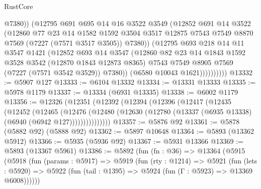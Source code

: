 \begin{lexlean}{RustCore}
\begin{coremodule}
                      @7380))
                  (@12795
                    @691
                    @695
                    @14
                    @16
                    @3522
                    @3549
                    (@12852
                      @691
                      @14
                      @3522
                      (@12860
                        @77
                        @23
                        @14
                        @1582
                        @1592
                        @3504
                        @3517
                        @12875
                        @7543
                        @7549
                        @8870
                        @7569
                        (@7227 (@7571 @3517 @3505))
                        @7380))
                    (@12795
                      @693
                      @218
                      @14
                      @11
                      @3547
                      @1421
                      (@12852
                        @693
                        @14
                        @3547
                        (@12860
                          @82
                          @23
                          @14
                          @1843
                          @1592
                          @3528
                          @3542
                          (@12870 @1843 @12873 @8365)
                          @7543
                          @7549
                          @8905
                          @7569
                          (@7227 (@7571 @3542 @3529))
                          @7380))
                      (@6580 @10043 @1621))))))))))
@13332 := @5907 @127
@13333 := @6104 @13332
@13334 := @13331 @13333
@13335 := @5978 @1179
@13337 := @13334 (@6931 @13335)
@13338 := @6002 @1179
@13356 := @12326
    (@12351
      (@12392
        (@12394
          (@12396
            (@12417
              (@12435
                (@12452
                  (@12465
                    (@12476
                      (@12480
                        (@12630 (@12780 (@13337 (@6935 @13338) (@6940 (@6942 @127)))))))))))))))
@13357 := @5876 @92
@13361 := @5878 (@5882 @92) (@5888 @92)
@13362 := @5897 @10648
@13364 := @5893 (@13362 @5912)
@13366 := @5935 (@5936 @92)
@13367 := @5931 @13366
@13369 := @5893 (@13367 @5961)
@13386 := @5892
    (fun (fn : @36) =>
    @13364
      (@5915
        (@5918
          (fun (params : @5917) =>
          @5919
            (fun (rty : @1214) =>
            @5921
              (fun (lets : @5920) =>
              @5922 (fun (tail : @1395) => @5924 (fun (Γ : @5923) => @13369 @6008))))))

\end{coremodule}
\end{lexlean}
